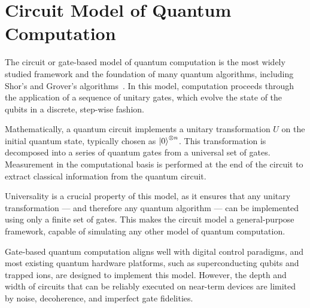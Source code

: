 \section{Circuit Model of Quantum Computation}
\label{Section:GateModelQC}

The circuit or gate-based model of quantum computation is the most widely studied framework and the foundation of many quantum algorithms, including Shor's and Grover's algorithms~\cite{nielsen00}. In this model, computation proceeds through the application of a sequence of unitary gates, which evolve the state of the qubits in a discrete, step-wise fashion.

Mathematically, a quantum circuit implements a unitary transformation $U$ on the initial quantum state, typically chosen as $\ket{0}^{\otimes n}$. This transformation is decomposed into a series of quantum gates from a universal set of gates. Measurement in the computational basis is performed at the end of the circuit to extract classical information from the quantum circuit.

Universality is a crucial property of this model, as it ensures that any unitary transformation --- and therefore any quantum algorithm --- can be implemented using only a finite set of gates. This makes the circuit model a general-purpose framework, capable of simulating any other model of quantum computation.

Gate-based quantum computation aligns well with digital control paradigms, and most existing quantum hardware platforms, such as superconducting qubits and trapped ions, are designed to implement this model. However, the depth and width of circuits that can be reliably executed on near-term devices are limited by noise, decoherence, and imperfect gate fidelities.